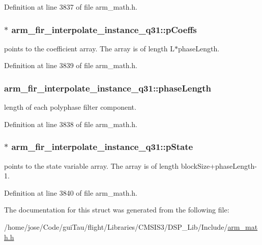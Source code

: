 Definition at line 3837 of file arm\-\_\-math.\-h.

\hypertarget{structarm__fir__interpolate__instance__q31_afa719433687e1936ec3403d0d32f06e6}{
\subsubsection[{p\-Coeffs}]{$\ast$ arm\-\_\-fir\-\_\-interpolate\-\_\-instance\-\_\-q31\-::p\-Coeffs}}\label{structarm__fir__interpolate__instance__q31_afa719433687e1936ec3403d0d32f06e6}
points to the coefficient array. The array is of length L$\ast$phase\-Length. 

Definition at line 3839 of file arm\-\_\-math.\-h.

\hypertarget{structarm__fir__interpolate__instance__q31_a5d243796584afc7cd6c557f00b7acca5}{
\subsubsection[{phase\-Length}]{ arm\-\_\-fir\-\_\-interpolate\-\_\-instance\-\_\-q31\-::phase\-Length}}\label{structarm__fir__interpolate__instance__q31_a5d243796584afc7cd6c557f00b7acca5}
length of each polyphase filter component. 

Definition at line 3838 of file arm\-\_\-math.\-h.

\hypertarget{structarm__fir__interpolate__instance__q31_addde04514b6e6ac72be3d609f0398b1a}{
\subsubsection[{p\-State}]{$\ast$ arm\-\_\-fir\-\_\-interpolate\-\_\-instance\-\_\-q31\-::p\-State}}\label{structarm__fir__interpolate__instance__q31_addde04514b6e6ac72be3d609f0398b1a}
points to the state variable array. The array is of length block\-Size+phase\-Length-\/1. 

Definition at line 3840 of file arm\-\_\-math.\-h.



The documentation for this struct was generated from the following file\-:\begin{DoxyCompactItemize}
\item 
/home/jose/\-Code/gui\-Tau/flight/\-Libraries/\-C\-M\-S\-I\-S3/\-D\-S\-P\-\_\-\-Lib/\-Include/\hyperlink{arm__math_8h}{arm\-\_\-math.\-h}\end{DoxyCompactItemize}
